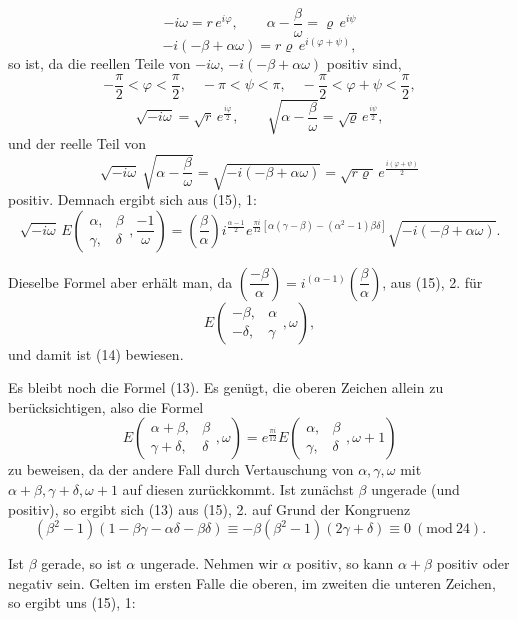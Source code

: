 \[
-i\omega = r\,e^{i\varphi}, \qquad \alpha-\frac{\beta}{\omega} = \varrho\,e^{i\psi}
\]
\[
-i(-\beta+\alpha\omega) = r\varrho\,e^{i(\varphi+\psi)},
\]
so ist, da die reellen Teile von $-i\omega$, $-i(-\beta+\alpha\omega)$ positiv sind,
\[
-\frac{\pi}{2} < \varphi < \frac{\pi}{2}, \quad -\pi < \psi < \pi, \quad
-\frac{\pi}{2} < \varphi+\psi < \frac{\pi}{2},
\]
\[
\sqrt{-i\omega} = \sqrt{r}\,e^{\frac{i\varphi}{2}}, \qquad
\sqrt{\alpha-\frac{\beta}{\omega}} = \sqrt{\varrho}\,e^{\frac{i\psi}{2}},
\]
und der reelle Teil von
\[
\sqrt{-i\omega}\ \sqrt{\alpha-\frac{\beta}{\omega}} = \sqrt{-i(-\beta+\alpha\omega)}
= \sqrt{r\varrho}\,e^{\frac{i(\varphi+\psi)}{2}}
\]
positiv. Demnach ergibt sich aus (15), 1:
\[
\sqrt{-i\omega}\, E\!\left(\begin{matrix}\alpha, & \beta \\ \gamma, & \delta\end{matrix}, \frac{-1}{\omega}\right)
= \left(\frac{\beta}{\alpha}\right) i^{\frac{\alpha-1}{2}}
e^{\frac{\pi i}{12}\left[\alpha(\gamma-\beta)-(\alpha^2-1)\beta\delta\right]}
\sqrt{-i(-\beta+\alpha\omega)}.
\]

Dieselbe Formel aber erhält man, da $\left(\dfrac{-\beta}{\alpha}\right)=i^{(\alpha-1)}\left(\dfrac{\beta}{\alpha}\right)$,
aus (15), 2. für
\[
E\!\left(\begin{matrix}-\beta, & \alpha \\ -\delta, & \gamma\end{matrix}, \omega\right),
\]
und damit ist (14) bewiesen.

Es bleibt noch die Formel (13). Es genügt, die oberen
Zeichen allein zu berücksichtigen, also die Formel
\[
E\!\left(\begin{matrix}\alpha+\beta, & \beta \\ \gamma+\delta, & \delta\end{matrix}, \omega\right)
= e^{\frac{\pi i}{12}} E\!\left(\begin{matrix}\alpha, & \beta \\ \gamma, & \delta\end{matrix}, \omega+1\right)
\]
zu beweisen, da der andere Fall durch Vertauschung von $\alpha, \gamma, \omega$
mit $\alpha+\beta, \gamma+\delta, \omega+1$ auf diesen zurückkommt. Ist zunächst
$\beta$ ungerade (und positiv), so ergibt sich (13) aus (15), 2. auf
Grund der Kongruenz
\[
(\beta^2-1)(1-\beta\gamma-\alpha\delta-\beta\delta) \equiv -\beta(\beta^2-1)(2\gamma+\delta) \equiv 0\ (\mathrm{mod}\ 24).
\]

Ist $\beta$ gerade, so ist $\alpha$ ungerade. Nehmen wir $\alpha$ positiv, so
kann $\alpha+\beta$ positiv oder negativ sein. Gelten im ersten Falle die
oberen, im zweiten die unteren Zeichen, so ergibt uns (15), 1:
